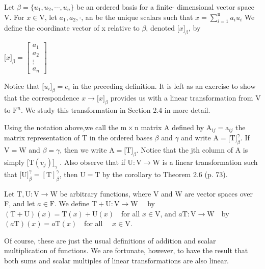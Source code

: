 \newpage
\begin{defn}
$ $\\ Let $\beta = \{ u_1,u_2,\cdots,u_n \}$ be an ordered basis for a finite- dimensional vector space V. For $x \in \mathrm{V}$, let $a_1, a_2, \cdot $, an be the unique scalars such that
$x = \sum_{i=1}^{\mathrm{n}} a_iu_i$
We define the coordinate vector of x relative to $\beta$, denoted $\lbrack x \rbrack_\beta$, by
\begin{center}
	 $\lbrack x \rbrack_\beta = \left[\begin{matrix}
	a_1 \\
	a_2 \\
	\vdots \\
	a_n 	
\end{matrix}\right]$
\end{center}

Notice that $\lbrack u_i \rbrack_\beta = e_i$ in the preceding definition. It is left as an exercise to show that the correspondence $x \rightarrow \lbrack x \rbrack_ \beta$ provides us with a linear transformation from V to $\mathrm{F}^n$. We study this transformation in Section 2.4 in more detail.
\end{defn}


\begin{defn} $ $\\
Using the notation above,we call the $\mathrm{m} \times \mathrm{n}$ matrix A defined by $\mathrm{A}_{ij} = \mathrm{a}_{ij}$ the matrix representation of T in the ordered bases $\beta$ and $\gamma$ and write $\mathrm{A} = \lbrack \mathrm{T} \rbrack^\gamma_\beta$. If $\mathrm{V} = \mathrm{W}$ and $\beta = \gamma$, then we write $\mathrm{A} = \lbrack \mathrm{T}\rbrack_\beta$.
Notice that the jth column of A is simply $\lbrack \mathrm{T} (v_j)\rbrack_\gamma$ . Also observe that if
$\mathrm{U} : \mathrm{V} \rightarrow \mathrm{W}$ is a linear transformation such that $\lbrack \mathrm{U} \rbrack^\gamma_\beta = [\mathrm{T}]^\gamma_\beta$, then $\mathrm{U} = \mathrm{T}$ by the corollary to Theorem 2.6 (p. 73).

\end{defn}

\begin{defn} $ $\\
Let $\mathrm{T} , \mathrm{U}: \mathrm{V} \rightarrow \mathrm{W}$ be arbitrary functions, where V and W are vector spaces over F, and let $a \in \mathrm{F}$. We define $\mathrm{T}+\mathrm{U} : \mathrm{V} \rightarrow \mathrm{W}$ \ \ by\ \ $(\mathrm{T}+\mathrm{U})(x) = \mathrm{T}(x)+\mathrm{U}(x)$\ \ for all $x \in \mathrm{V}$, and $a\mathrm{T}: \mathrm{V} \rightarrow \mathrm{W}$\ \ by\ \ $(a\mathrm{T})(x) = a\mathrm{T}(x)$\ \ for all \ \ $x \in \mathrm{V}$.


Of course, these are just the usual definitions of addition and scalar multiplication of functions. We are fortunate, however, to have the result that both sums and scalar multiples of linear transformations are also linear.
\end{defn}

